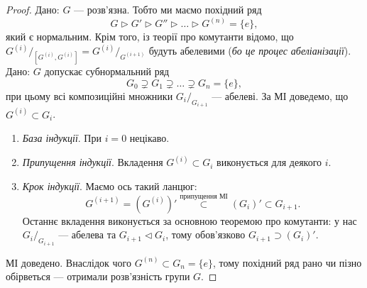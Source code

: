 \documentclass{math_library}
\begin{document}
\begin{proof}
\rightproof Дано: $G$ --- розв'язна. Тобто ми маємо похідний ряд
\[
G \triangleright G' \triangleright G'' \triangleright \dots \triangleright G^{(n)} = \{e\},
\]
який є нормальним. Крім того, із теорії про комутанти відомо, що $G^{(i)}/_{[G^{(i)},G^{(i)}]} = G^{(i)}/_{G^{(i+1)}}$ будуть абелевими (\textit{бо це процес абеліанізації}).
\bigskip \\
\leftproof Дано: $G$ допускає субнормальний ряд
\[
G_0 \supsetneq G_1 \supsetneq \dots \supsetneq G_n = \{e\},
\]
при цьому всі композиційні множники ${G_i}/_{G_{i+1}}$ --- абелеві. За МІ доведемо, що $G^{(i)} \subset G_i$.
\begin{enumerate}[nosep,wide=0pt,label={\Roman*.}]
\item \textit{База індукції}. При $i = 0$ нецікаво.
\item \textit{Припущення індукції}. Вкладення $G^{(i)} \subset G_i$ виконується для деякого $i$.
\item \textit{Крок індукції}. Маємо ось такий ланцюг:
\[
G^{(i+1)} = (G^{(i)})' \overset{\text{припущення МІ}}{\subset} (G_i)' \subset G_{i+1}.
\]
Останнє вкладення виконується за основною теоремою про комутанти: у нас $G_i/_{G_{i+1}}$ --- абелева та $G_{i+1} \triangleleft G_i$, тому обов'язково $G_{i+1} \supset (G_i)'$.
\end{enumerate}
МІ доведено. Внаслідок чого $G^{(n)} \subset G_n = \{e\}$, тому похідний ряд рано чи пізно обірветься --- отримали розв'язність групи $G$.

\end{proof}
\end{document}

